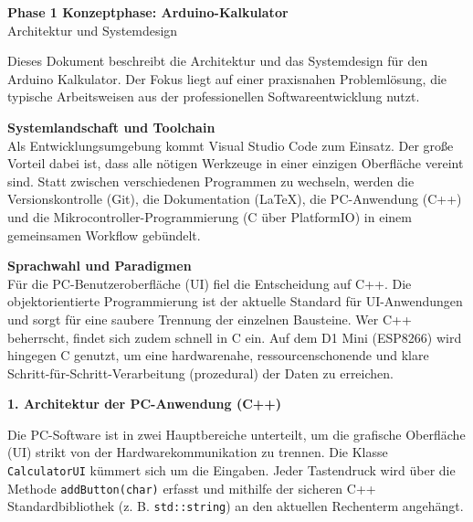 \documentclass[12pt, a4paper]{article}
\begin{document}
\begin{center}
    \Large\textbf{Phase 1 Konzeptphase: Arduino-Kalkulator} \\
    \vspace{0.3cm}
    \normalsize Architektur und Systemdesign
\end{center}
\vspace{0.5cm}

Dieses Dokument beschreibt die Architektur und das Systemdesign für den Arduino Kalkulator. Der Fokus liegt auf einer praxisnahen Problemlösung, die typische Arbeitsweisen aus der professionellen Softwareentwicklung nutzt.

\vspace{0.3cm}
\textbf{Systemlandschaft und Toolchain} \\
Als Entwicklungsumgebung kommt Visual Studio Code zum Einsatz. Der große Vorteil dabei ist, dass alle nötigen Werkzeuge in einer einzigen Oberfläche vereint sind. Statt zwischen verschiedenen Programmen zu wechseln, werden die Versionskontrolle (Git), die Dokumentation (LaTeX), die PC-Anwendung (C++) und die Mikrocontroller-Programmierung (C über PlatformIO) in einem gemeinsamen Workflow gebündelt.

\vspace{0.3cm}
\textbf{Sprachwahl und Paradigmen} \\
Für die PC-Benutzeroberfläche (UI) fiel die Entscheidung auf C++. Die objektorientierte Programmierung ist der aktuelle Standard für UI-Anwendungen und sorgt für eine saubere Trennung der einzelnen Bausteine. Wer C++ beherrscht, findet sich zudem schnell in C ein. Auf dem D1 Mini (ESP8266) wird hingegen C genutzt, um eine hardwarenahe, ressourcenschonende und klare Schritt-für-Schritt-Verarbeitung (prozedural) der Daten zu erreichen.

\vspace{0.5cm}
\textbf{1. Architektur der PC-Anwendung (C++)}

Die PC-Software ist in zwei Hauptbereiche unterteilt, um die grafische Oberfläche (UI) strikt von der Hardwarekommunikation zu trennen. Die Klasse \texttt{CalculatorUI} kümmert sich um die Eingaben. Jeder Tastendruck wird über die Methode \texttt{addButton(char)} erfasst und mithilfe der sicheren C++ Standardbibliothek (z. B. \texttt{std::string}) an den aktuellen Rechenterm angehängt.
\end{document}
